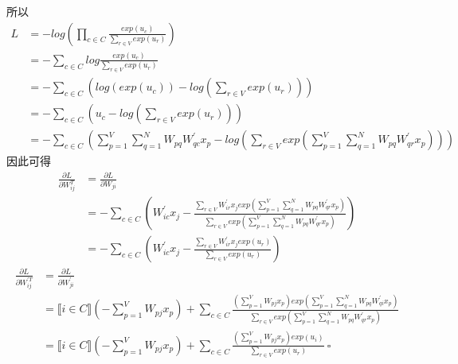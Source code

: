 \documentclass{article}
\begin{document}
所以
\begin{align*}
    L &= -log(\prod_{c \in C} \frac{exp(u_c)}{\sum_{r \in V} exp(u_r)})\\
    &= -\sum_{c \in C} log \frac{exp(u_c)}{\sum_{r \in V} exp(u_r)}\\
    &= -\sum_{c \in C} (log (exp(u_c)) - log (\sum_{r \in V} exp(u_r)))\\
    &= -\sum_{c \in C} (u_c - log (\sum_{r \in V} exp(u_r)))\\
    &= -\sum_{c \in C} (\sum_{p = 1}^V \sum_{q = 1}^N W_{pq} W^\prime_{qc} x_p - log (\sum_{r \in V} exp(\sum_{p = 1}^V \sum_{q = 1}^N W_{pq} W^\prime_{qr} x_p)))
\end{align*}
因此可得
\begin{align*}
    \frac{\partial L}{\partial W^T_{ij}} &= \frac{\partial L}{\partial W_{ji}}\\
    &= -\sum_{c \in C} (W^\prime_{ic} x_j - \frac{\sum_{r \in V} W^\prime_{ir} x_j exp(\sum_{p = 1}^V \sum_{q = 1}^N W_{pq} W^\prime_{qr} x_p)}{\sum_{r \in V} exp(\sum_{p = 1}^V \sum_{q = 1}^N W_{pq} W^\prime_{qr} x_p)})\\
    &= -\sum_{c \in C} (W^\prime_{ic} x_j - \frac{\sum_{r \in V} W^\prime_{ir} x_j exp(u_r)}{\sum_{r \in V} exp(u_r)})
\end{align*}
\begin{align*}
    \frac{\partial L}{\partial W^{\prime T}_{ij}} &= \frac{\partial L}{\partial W^\prime_{ji}}\\
    &= \llbracket i \in C \rrbracket (-\sum_{p = 1}^V W_{pj} x_p) + \sum_{c \in C} \frac{(\sum_{p = 1}^V W_{pj} x_p) exp(\sum_{p = 1}^V \sum_{q = 1}^N W_{pq} W^\prime_{qi} x_p)}{\sum_{r \in V} exp(\sum_{p = 1}^V \sum_{q = 1}^N W_{pq} W^\prime_{qr} x_p)}\\
    &= \llbracket i \in C \rrbracket (-\sum_{p = 1}^V W_{pj} x_p) + \sum_{c \in C} \frac{(\sum_{p = 1}^V W_{pj} x_p) exp(u_i)}{\sum_{r \in V} exp(u_r)}\ \square
\end{align*}
\end{document}
